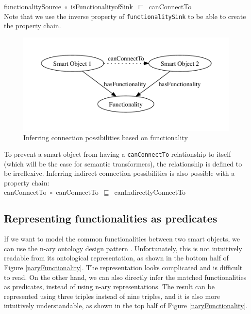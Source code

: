 \noindent
functionalitySource~\ensuremath{\circ}~isFunctionalityofSink~\ensuremath{\sqsubseteq}~canConnectTo\\%

Note that we use the inverse property of \texttt{functionalitySink} to be able to create the property chain.

\begin{figure}[bth]
        \includegraphics[width=\linewidth]{canConnectTo}
        \caption{Inferring connection possibilities based on functionality}
        \label{canConnectTo}
\end{figure}

To prevent a smart object from having a \texttt{canConnectTo} relationship to itself (which will be the case for semantic transformers), the relationship is defined to be irreflexive. Inferring indirect connection possibilities is also possible with a property chain:\\

\noindent
canConnectTo~\ensuremath{\circ}~canConnectTo~\ensuremath{\sqsubseteq}~canIndirectlyConnectTo



\subsection{Representing functionalities as predicates}
\label{predicateFunctionality}
If we want to model the common functionalities between two smart objects, we can use the n-ary ontology design pattern \cite{Noy2006}. Unfortunately, this is not intuitively readable from its ontological representation, as shown in the bottom half of Figure \ref{naryFunctionality}. The representation looks complicated and is difficult to read. On the other hand, we can also directly infer the matched functionalities as predicates, instead of using n-ary representations. The result can be represented using three triples instead of nine triples, and it is also more intuitively understandable, as shown in the top half of Figure \ref{naryFunctionality}.

